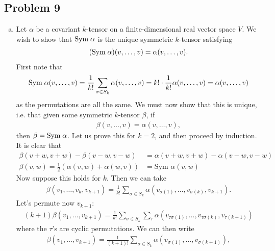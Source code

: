\documentclass{../../mathnotes}
\begin{document}
\subsection*{Problem 9}

\begin{enumerate}[(a)]
    \item Let $\alpha$ be a covariant $k$-tensor on a finite-dimensional real vector space $V$. We wish to show that
        $\text{Sym\;}\alpha$ is the unique symmetric $k$-tensor satisfying
        \begin{align*}
            (\text{Sym\;}\alpha)(v,\ldots,v)=\alpha(v,\ldots, v).
        \end{align*}
        First note that 
        \[\text{Sym\;}\alpha(v,\ldots,v)=\frac{1}{k!}\sum_{\sigma\in S_k}\alpha(v,\ldots, v)=k!\cdot\frac{1}{k!}\alpha(v,\ldots,v)=\alpha(v,\ldots, v)\]
        as the permutations are all the same. We must now show that this is unique, i.e. that given some symmetric $k$-tensor $\beta$, if
        \begin{align*}
            \beta(v,\ldots,v)=\alpha(v,\ldots, v),
        \end{align*}
        then $\beta=\text{Sym\;}\alpha$. Let us prove this for $k=2$, and then proceed by induction.
        It is clear that
        \begin{align*}
            \beta(v+w,v+w)-\beta(v-w,v-w)&=\alpha(v+w,v+w)-\alpha(v-w,v-w)\\
            \beta(v,w)=\frac{1}{2}\left( \alpha(v,w)+\alpha(w,v) \right)&=\text{Sym }\alpha(v,w)
        \end{align*}
        Now suppose this holds for $k$. Then we can take
        \begin{align*}
            \beta(v_1,\ldots,v_k,v_{k+1})=\frac{1}{k!}\sum_{\sigma\in S_k}\alpha(v_{\sigma(1)},\ldots, v_{\sigma(k)},v_{k+1}).
        \end{align*}
        Let's permute now $v_{k+1}$:
        \begin{align*}
            (k+1)\beta(v_1,\ldots,v_{k+1})=\frac{1}{k!}\sum_{\sigma \in S_k}\sum_{\tau}\alpha(v_{\tau\sigma(1)},\ldots,v_{\tau\sigma(k)},v_{\tau(k+1)})
        \end{align*}
        where the $\tau$'s are cyclic permutations. We can then write
        \begin{align*}
            \beta(v_1,\ldots,v_{k+1})=\frac{1}{(k+1)!}\sum_{\sigma\in S_k}\alpha(v_{\sigma(1)},\ldots, v_{\sigma(k+1)}),
        \end{align*}

\end{enumerate}
\end{document}
